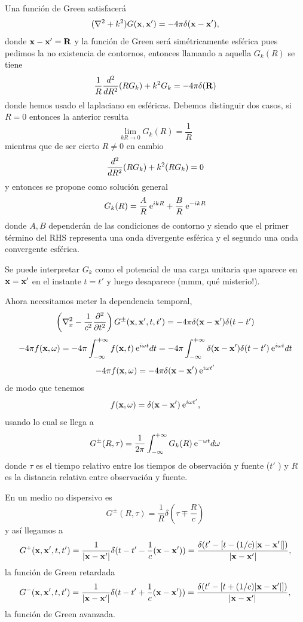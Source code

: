 \documentclass[10pt,oneside]{CBFT_book}
\begin{document}
Una función de Green satisfacerá 
\[
	(\nabla^2 + k^2) G(\vb{x},\vb{x}') = - 4\pi \delta(\vb{x}-\vb{x}'),
\]
donde $\vb{x}-\vb{x}' = \vb{R}$ y la función de Green será simétricamente esférica pues pedimos la
no existencia de contornos, entonces llamando a aquella $G_k(R)$ se tiene 
\[
	\frac{1}{R}\dtot[2]{}{R}(RG_k) + k^2 G_k = - 4 \pi \delta (\vb{R})
\]
donde hemos usado el laplaciano en esféricas. Debemos distinguir dos casos, si $R=0$ entonces la
anterior resulta 
\[
	\lim_{kR \to 0} G_k(R) = \frac{1}{R}
\]
mientras que de ser cierto $R\neq 0$ en cambio
\[
	\dtot[2]{}{R}(RG_k) + k^2 (RG_k) = 0
\]
y entonces se propone como solución general 
\[
	G_k(R) = \frac{ A }{ R } \euler^{ i k R } + \frac{ B }{ R } \euler^{ -i k R }
\]
donde $A, B$ dependerán de las condiciones de contorno y siendo que el primer término del RHS representa
una onda divergente esférica y el segundo una onda convergente esférica.

Se puede interpretar $G_k$ como el potencial de una carga unitaria que aparece en $\vb{x}=\vb{x}'$ en el
instante $t=t'$ y luego desaparece (mmm, qué misterio!).

Ahora necesitamos meter la dependencia temporal,
\[
	\left(\nabla^2_x - \frac{1}{c^2}\dpar[2]{}{t} \right) G^{\pm}(\vb{x},\vb{x}',t,t') = 
	- 4 \pi \delta(\vb{x}-\vb{x}') \delta(t-t')
\]
\[
	- 4 \pi f(\vb{x},\omega) = -4 \pi \int_{-\infty}^{+\infty} f(\vb{x},t) \euler^{i\omega t} dt =
		-4 \pi \int_{-\infty}^{+\infty} \delta(\vb{x}-\vb{x}') \delta(t-t') \euler^{i\omega t} dt
\]
\[
	- 4 \pi f(\vb{x},\omega) = -4 \pi \delta(\vb{x}-\vb{x}') \euler^{i\omega t'} 
\]
de modo que tenemos 
\[
	f(\vb{x},\omega) = \delta(\vb{x}-\vb{x}') \euler^{i\omega t'} ,
\]
usando lo cual se llega a
\[
	G^{\pm}(R,\tau) = \frac{1}{2\pi} \int_{-\infty}^{+\infty} G_k(R) \euler^{-\omega t} d\omega
\]
donde $\tau$ es el tiempo relativo entre los tiempos de observación y fuente ($t'$ ) y $R$ es la distancia 
relativa entre observación y fuente.

En un medio no dispersivo es 
\[
	G^{\pm}(R,\tau) = \frac{1}{R} \delta( \tau \mp \frac{R}{c})
\]
y así llegamos a
\[
	G^+(\vb{x},\vb{x}',t,t') = \frac{1}{|\vb{x} - \vb{x}'|} \delta( t-t' - \frac{1}{c}(\vb{x} - 
	\vb{x}')) = \frac{ \delta(t' - [t-(1/c)|\vb{x} - \vb{x}'|]) }{|\vb{x} - \vb{x}'|} ,
\]
la función de Green retardada
\[
	G^-(\vb{x},\vb{x}',t,t') = \frac{1}{|\vb{x} - \vb{x}'|} \delta( t-t' + \frac{1}{c}(\vb{x} - 
	\vb{x}')) = \frac{ \delta(t' - [t + (1/c)|\vb{x} - \vb{x}'|]) }{|\vb{x} - \vb{x}'|},
\]
la función de Green avanzada.
\end{document}
